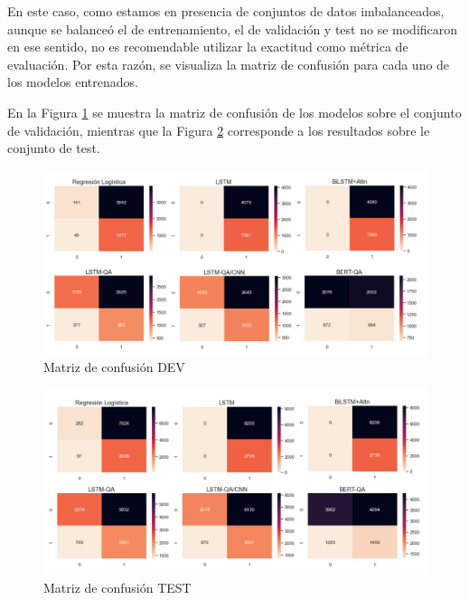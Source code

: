 En este caso, como estamos en presencia de conjuntos de datos imbalanceados, aunque se balanceó el de entrenamiento, el de validación y test no se modificaron en ese sentido, no es recomendable utilizar la exactitud como métrica de evaluación. Por esta razón, se visualiza la matriz de confusión para cada uno de los modelos entrenados.

En la Figura \ref{dev_cm} se muestra la matriz de confusión de los modelos sobre el conjunto de validación, mientras que la Figura \ref{test_cm} corresponde a los resultados sobre le conjunto de test.

\begin{figure}[!tb]
  \begin{center}
    \includegraphics[angle=0, width=1\textwidth]{Graphics/dev_cm.png}
  \end{center}
    \caption{Matriz de confusión DEV}\label{dev_cm}
\end{figure}

\begin{figure}[!ht]
  \begin{center}
    \includegraphics[angle=0, width=1\textwidth]{Graphics/test_cm.png}
  \end{center}
    \caption{Matriz de confusión TEST}\label{test_cm}
\end{figure}

